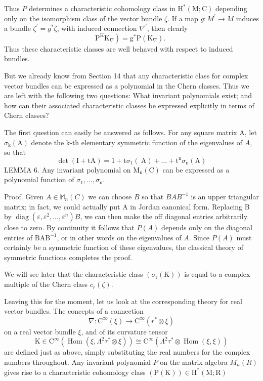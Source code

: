 \documentclass[10pt]{article}
\begin{document}
Thus $P$ determines a characteristic cohomology class in $\mathrm{H}^{*}(\mathrm{M} ; \mathrm{C})$ depending only on the isomorphism class of the vector bundle $\zeta$. If a map $g: M^{\prime} \rightarrow M$ induces a bundle $\zeta^{\prime}=g^{*} \zeta$, with induced connection $\nabla^{\prime}$, then clearly
$$
\left.\mathrm{P}^{\mathrm{K}} \mathrm{K}_{\nabla}\right)=\mathrm{g}^{*} \mathrm{P}\left(\mathrm{K}_{\nabla}\right) \text {. }
$$
Thus these characteristic classes are well behaved with respect to induced bundles.

But we already know from Section 14 that any characteristic class for complex vector bundles can be expressed as a polynomial in the Chern classes. Thus we are left with the following two questions: What invariant polynomials exist; and how can their associated characteristic classes be expressed explicitly in terms of Chern classes?

The first question can easily be answered as follows. For any square matrix $\mathrm{A}$, let $\sigma_{\mathrm{k}}(\mathrm{A})$ denote the $\mathrm{k}$-th elementary symmetric function of the eigenvalues of $A$, so that
$$
\operatorname{det}(\mathrm{I}+\mathrm{tA})=1+\mathrm{t} \sigma_{1}(\mathrm{~A})+\ldots+\mathrm{t}^{\mathrm{n}} \sigma_{\mathrm{n}}(\mathrm{A})
$$
LEMMA 6. Any invariant polynomial on $\mathrm{M}_{\mathrm{n}}(\mathrm{C})$ can be expressed as a polynomial function of $\sigma_{1}, \ldots, \sigma_{\mathrm{n}}$.

Proof. Given $A \in \mathbb{M}_{n}(C)$ we can choose $B$ so that $B A B^{-1}$ is an upper triangular matrix; in fact, we could actually put A in Jordan canonical form. Replacing B by $\operatorname{diag}\left(\varepsilon, \varepsilon^{2}, \ldots, \varepsilon^{n}\right) B$, we can then make the off diagonal entries arbitrarily close to zero. By continuity it follows that $P(A)$ depends only on the diagonal entries of $\mathrm{BAB}^{-1}$, or in other words on the eigenvalues of $A$. Since $P(A)$ must certainly be a symmetric function of these eigenvalues, the classical theory of symmetric functions completes the proof.

We will see later that the characteristic class $\left(\sigma_{\mathrm{r}}(\mathrm{K})\right)$ is equal to a complex multiple of the Chern class $c_{r}(\zeta)$.

Leaving this for the moment, let us look at the corresponding theory for real vector bundles. The concepts of a connection
$$
\nabla: \mathrm{C}^{\infty}(\xi) \rightarrow \mathrm{C}^{\infty}\left(r^{*} \otimes \xi\right)
$$
on a real vector bundle $\xi$, and of its curvature tensor
$$
\mathrm{K} \in \mathrm{C}^{\infty}\left(\operatorname{Hom}\left(\xi, \Lambda^{2} \tau^{*} \otimes \xi\right)\right) \cong \mathrm{C}^{\infty}\left(\Lambda^{2} \tau^{*} \otimes \operatorname{Hom}(\xi, \xi)\right)
$$
are defined just as above, simply substituting the real numbers for the complex numbers throughout. Any invariant polynomial $P$ on the matrix algebra $M_{n}(R)$ gives rise to a characteristic cohomology class $(\mathrm{P}(\mathrm{K})) \in \mathrm{H}^{*}(\mathrm{M} ; \mathrm{R})$
\end{document}
